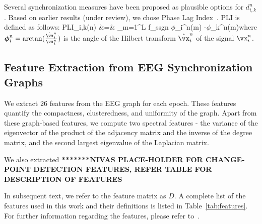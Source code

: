 \documentclass{article} %
\theoremstyle{definition}
\theoremstyle{remark}
\newcommand{\vphi}{\mbox{\boldmath $\phi$\unboldmath}}
\begin{document}
Several synchronization measures have been proposed as plausible options for $d_{i,k}^{n}$.  Based on earlier results (under review), we chose Phase Lag Index~\cite{stam_pli}.  PLI is defined as follows:
\bea  
PLI_{i,k}(n)  &=&    \left\rvert\sum_{m=1}^{L f_s}\mbox{sgn}\lc
\vphi_i^{n}(m) -\vphi_k^{n}(m)\rc\right\rvert \eea  where $\vphi_{i}^{n} = \arctan({\frac{\hat{\vx}_{i}^{n}}{\vx_{i}^{n}}})$ is the angle of the Hilbert transform $\hat{\vx}_{i}^{n}$ of the signal $\vx_{i}^{n}$.  

\subsection{Feature Extraction from EEG Synchronization Graphs} \label{sec:graph_feats}
We extract $26$ features from the EEG  graph for each epoch.  These features quantify the compactness, clusteredness, and uniformity of
the graph.  Apart from these graph-based features, we compute two spectral features - the variance of the eigenvector of the product of the adjacency matrix and the inverse of the degree matrix, and the second largest eigenvalue of the Laplacian matrix.

We also extracted \textbf{*******NIVAS PLACE-HOLDER FOR CHANGE-POINT DETECTION FEATURES, REFER TABLE FOR DESCRIPTION OF FEATURES}

In subsequent text, we refer to the feature matrix as $D$.  A complete list of the features used in this work and their definitions is listed in Table~\ref{tab:features}.  For further information regarding the features, please refer to~\cite{bilgin_multiscale}. 
\end{document}
